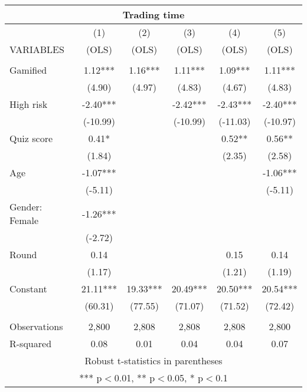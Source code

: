 \documentclass[]{article}
\begin{document}
\begin{tabular}{lccccc}
\multicolumn{6}{c}{Trading time} \\ \hline
 & (1) & (2) & (3) & (4) & (5) \\
VARIABLES & (OLS) & (OLS) & (OLS) & (OLS) & (OLS) \\ \hline
 &  &  &  &  &  \\
Gamified & 1.12*** & 1.16*** & 1.11*** & 1.09*** & 1.11*** \\
 & (4.90) & (4.97) & (4.83) & (4.67) & (4.83) \\
High risk & -2.40*** &  & -2.42*** & -2.43*** & -2.40*** \\
 & (-10.99) &  & (-10.99) & (-11.03) & (-10.97) \\
Quiz score & 0.41* &  &  & 0.52** & 0.56** \\
 & (1.84) &  &  & (2.35) & (2.58) \\
Age & -1.07*** &  &  &  & -1.06*** \\
 & (-5.11) &  &  &  & (-5.11) \\
Gender: Female & -1.26*** &  &  &  &  \\
 & (-2.72) &  &  &  &  \\
Round & 0.14 &  &  & 0.15 & 0.14 \\
 & (1.17) &  &  & (1.21) & (1.19) \\
Constant & 21.11*** & 19.33*** & 20.49*** & 20.50*** & 20.54*** \\
 & (60.31) & (77.55) & (71.07) & (71.52) & (72.42) \\
 &  &  &  &  &  \\
Observations & 2,800 & 2,808 & 2,808 & 2,808 & 2,800 \\
 R-squared & 0.08 & 0.01 & 0.04 & 0.04 & 0.07 \\ \hline
\multicolumn{6}{c}{ Robust t-statistics in parentheses} \\
\multicolumn{6}{c}{ *** p$<$0.01, ** p$<$0.05, * p$<$0.1} \\
\end{tabular}
\end{document}

